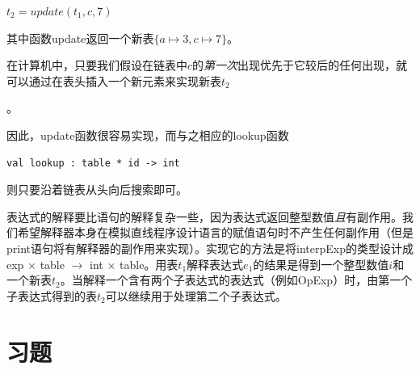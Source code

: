 \documentclass[cn,11pt,chinese]{elegantbook}
\begin{document}
$t_2=update(t_1,c,7)$

其中函数update返回一个新表$\{a \mapsto 3,c \mapsto 7\}$。

在计算机中，只要我们假设在链表中$c$的\textit{第一次}出现优先于它较后的任何出现，就可以通过在表头插入一个新元素来实现新表$t_2$
。

因此，update函数很容易实现，而与之相应的lookup函数

\begin{verbatim}
val lookup : table * id -> int
\end{verbatim}

则只要沿着链表从头向后搜索即可。

表达式的解释要比语句的解释复杂一些，因为表达式返回整型数值\textit{且}有副作用。我们希望解释器本身在模拟直线程序设计语言的赋值语句时不产生任何副作用（但是print语句将有解释器的副作用来实现）。实现它的方法是将interpExp的类型设计成exp $\times$ table $\rightarrow$ int $\times$ table。用表$t_1$解释表达式$e_1$的结果是得到一个整型数值$i$和一个新表$t_2$。当解释一个含有两个子表达式的表达式（例如OpExp）时，由第一个子表达式得到的表$t_2$可以继续用于处理第二个子表达式。

\section{习题}
\end{document}
